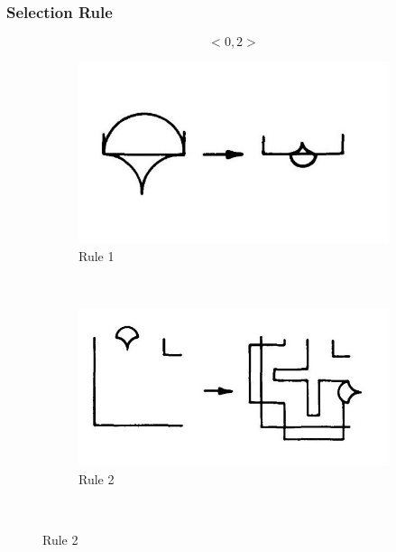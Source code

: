 \documentclass[11pt, a4paper]{report}
\begin{document}
\subsubsection{Selection Rule}
\begin{equation}
<0,2>
\end{equation}

\begin{figure}
    \centering
    \begin{subfigure}[b]{0.3\textwidth}
        \includegraphics[width=\textwidth]{sg_specification_rule1.jpg}
        \caption{Rule 1}
        \label{fig:Shape Grammars/Shape Specification/Rule 1}
    \end{subfigure}
    ~ %
    \begin{subfigure}[b]{0.3\textwidth}
        \includegraphics[width=\textwidth]{sg_specification_rule2.jpg}
        \caption{Rule 2}
        \label{fig:Shape Grammars/Shape Specification/Rule 2}
    \end{subfigure}
    ~ %

\end{figure}
\end{document}
